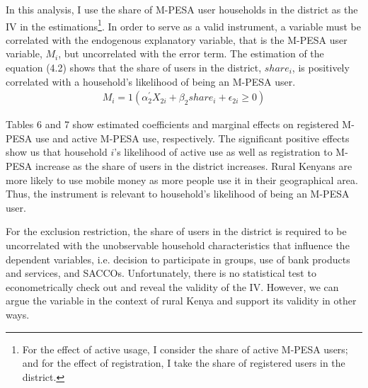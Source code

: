 \documentclass[11pt]{article}
\numberwithin{equation}{section}
\begin{document}
 
In this analysis, I use the share of M-PESA user households in the district as the IV in the estimations\footnote{For the effect of active usage, I consider the share of active M-PESA users; and for the effect of registration, I take the share of registered users in the district.}. In order to serve as a valid instrument, a variable must be correlated with the endogenous explanatory variable, that is the M-PESA user variable, $M_i$, but uncorrelated with the error term. The estimation of the equation (4.2) shows that the share of users in the district, $share_i$, is positively correlated with a household's likelihood of being an M-PESA user. 
\begin{align}
M_i= 1(\alpha_2 ^{'} X_{2i}+ \beta_2 share_i+\epsilon_{2i} \ge 0)
\end{align}\par
Tables 6 and 7 show estimated coefficients and marginal effects on registered M-PESA use and active M-PESA use, respectively.  The significant positive effects show us that household $i$'s likelihood of active use as well as registration to M-PESA increase as the share of users in the district increases. Rural Kenyans are more likely to use mobile money as more people use it in their geographical area. Thus, the instrument is relevant to household's likelihood of being an M-PESA user.

For the exclusion restriction, the share of users in the district is required to be uncorrelated with the unobservable household characteristics that influence the dependent variables, i.e. decision to participate in groups, use of bank products and services, and SACCOs. Unfortunately, there is no statistical test to econometrically check out and reveal the validity of the IV. However, we can argue the variable in the context of rural Kenya and support its validity in other ways.


\end{document}
